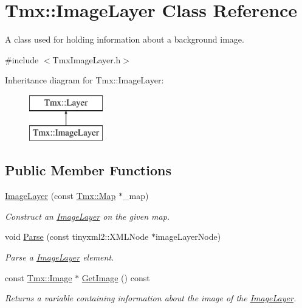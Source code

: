 \hypertarget{classTmx_1_1ImageLayer}{\section{Tmx\-:\-:Image\-Layer Class Reference}
\label{classTmx_1_1ImageLayer}
}


A class used for holding information about a background image.  




{\ttfamily \#include $<$Tmx\-Image\-Layer.\-h$>$}

Inheritance diagram for Tmx\-:\-:Image\-Layer\-:\begin{figure}[H]
\begin{center}
\leavevmode
\includegraphics[height=2.000000cm]{classTmx_1_1ImageLayer}
\end{center}
\end{figure}
\subsection*{Public Member Functions}
\begin{DoxyCompactItemize}
\item 
\hypertarget{classTmx_1_1ImageLayer_adac463694d851f0468723318ad511264}{\hyperlink{classTmx_1_1ImageLayer_adac463694d851f0468723318ad511264}{Image\-Layer} (const \hyperlink{classTmx_1_1Map}{Tmx\-::\-Map} $\ast$\-\_\-map)}\label{classTmx_1_1ImageLayer_adac463694d851f0468723318ad511264}

\begin{DoxyCompactList}\small\item\em Construct an \hyperlink{classTmx_1_1ImageLayer}{Image\-Layer} on the given map. \end{DoxyCompactList}\item 
\hypertarget{classTmx_1_1ImageLayer_a5441c6a1393d0b9bea4356f048f8a5c8}{void \hyperlink{classTmx_1_1ImageLayer_a5441c6a1393d0b9bea4356f048f8a5c8}{Parse} (const tinyxml2\-::\-X\-M\-L\-Node $\ast$image\-Layer\-Node)}\label{classTmx_1_1ImageLayer_a5441c6a1393d0b9bea4356f048f8a5c8}

\begin{DoxyCompactList}\small\item\em Parse a \hyperlink{classTmx_1_1ImageLayer}{Image\-Layer} element. \end{DoxyCompactList}\item 
const \hyperlink{classTmx_1_1Image}{Tmx\-::\-Image} $\ast$ \hyperlink{classTmx_1_1ImageLayer_a9963adeceff59ea92933755f13ce8fa9}{Get\-Image} () const 
\begin{DoxyCompactList}\small\item\em Returns a variable containing information about the image of the \hyperlink{classTmx_1_1ImageLayer}{Image\-Layer}. \end{DoxyCompactList}\end{DoxyCompactItemize}


